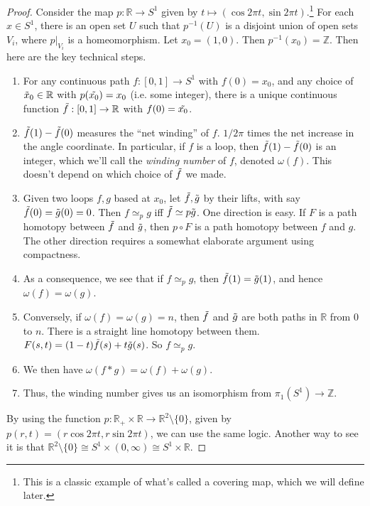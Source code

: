   \begin{proof}
    Consider the map $p: \mathbb{R} \to S^1$ given by $t \mapsto (\cos{2 \pi t}, \sin{2 \pi t})$.\footnote{This is a classic example of what's called a covering map, which we will define later.} For each $x \in S^1$, there is an open set $U$ such that $p^{-1} (U)$ is a disjoint union of open sets $V_{i}$, where $p|_{V_i}$ is a homeomorphism. Let $x_0 = (1, 0)$. Then $p^{-1} (x_0) = \mathbb{Z}$. Then here are the key technical steps. 
    \begin{enumerate}
      \item For any continuous path $f: [0, 1] \to S^1$ with $f(0) = x_0$, and any choice of $\Tilde{x}_0 \in \mathbb{R}$ with $p(\Tilde{x_0}) = x_0$ (i.e. some integer), there is a unique continuous function $\Tilde{f}: [0, 1] \to \mathbb{R}$ with $f(0) = \Tilde{x_0}$. 
      \item $\Tilde{f}(1) - \Tilde{f}(0)$ measures the ``net winding'' of $f$. $1/2\pi$ times the net increase in the angle coordinate. In particular, if $f$ is a loop, then $\Tilde{f} (1) - \Tilde{f}(0)$ is an integer, which we'll call the \textit{winding number} of $f$, denoted $\omega (f)$. This doesn't depend on which choice of $\Tilde{f}$ we made. 
      \item Given two loops $f, g$ based at $x_0$, let $\Tilde{f}, \Tilde{g}$ by their lifts, with say $\Tilde{f}(0) = \Tilde{g}(0) = 0$. Then $f \simeq_p g$ iff $\Tilde{f} \simeq p \Tilde{g}$. One direction is easy. If $F$ is a path homotopy between $\Tilde{f}$ and $\Tilde{g}$, then $p \circ F$ is a path homotopy between $f$ and $g$. The other direction requires a somewhat elaborate argument using compactness. 
      \item As a consequence, we see that if $f \simeq_p g$, then $\Tilde{f} (1) = \Tilde{g} (1)$, and hence $\omega (f) = \omega(g)$. 
      \item Conversely, if $\omega(f) = \omega(g) = n$, then $\Tilde{f}$ and $\Tilde{g}$ are both paths in $\mathbb{R}$ from $0$ to $n$. There is a straight line homotopy between them. $F(s, t) = (1 - t) \Tilde{f} (s) + t \Tilde{g}(s)$. So $f \simeq_p g$. 
      \item We then have $\omega(f \ast g) = \omega(f) + \omega(g)$. 
      \item Thus, the winding number gives us an isomorphism from $\pi_1 (S^1) \to \mathbb{Z}$. 
    \end{enumerate}
    By using the function $p: \mathbb{R}_+ \times \mathbb{R} \to \mathbb{R}^2 \setminus \{0\}$, given by $p(r, t) = (r \cos{2 \pi t}, r \sin{2 \pi t})$, we can use the same logic. Another way to see it is that $\mathbb{R}^2 \setminus \{0\} \cong S^1 \times (0, \infty) \cong S^1 \times \mathbb{R}$. 
  \end{proof}

